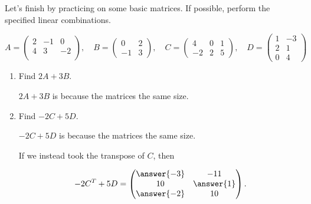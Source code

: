 \documentclass{ximera}
\begin{document}
\begin{exploration}
\begin{remark}
\end{remark}

Let's finish by practicing on some basic matrices. If possible, perform the specified linear combinations.

\[
A = \begin{pmatrix}
2 & -1 & 0 \\
4 & 3 & -2 \\
\end{pmatrix}, \quad
B = \begin{pmatrix}
0 & 2 \\
-1 & 3
\end{pmatrix}, \quad
C = \begin{pmatrix}
4 & 0 & 1 \\
-2 & 2 & 5
\end{pmatrix}, \quad
D = \begin{pmatrix}
1 & -3 \\
2 & 1 \\
0 & 4
\end{pmatrix}
\]

\begin{enumerate}
\item Find $2A+3B$.
\begin{solution}

  $2A+3B$ is  because the matrices  the same size.

\end{solution}
\item Find $-2C+5D$.

\begin{solution}

  $-2C+5D$ is  because the matrices  the same size.

\begin{problem}

  If we instead took the transpose of $C$, then 
  
  $$-2C^T+5D=\begin{pmatrix} \answer{-3} & -11 \\ 10 & \answer{1} \\ \answer{-2} & 10 \end{pmatrix}.$$

\end{problem}


\end{solution}
\end{enumerate}
\end{exploration}
\end{document}
